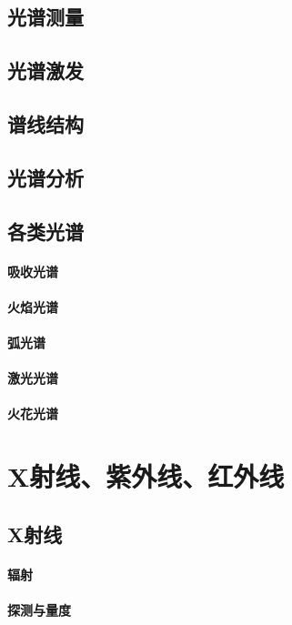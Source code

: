 \documentclass[UTF8]{../06-Physics}
\begin{document}
\section{光谱测量}
\section{光谱激发}
\section{谱线结构}
\section{光谱分析}
\section{各类光谱}
    \subsubsection{吸收光谱}
    \subsubsection{火焰光谱}
    \subsubsection{弧光谱}
    \subsubsection{激光光谱}
    \subsubsection{火花光谱}





\chapter{X射线、紫外线、红外线}
\section{X射线}
    \subsubsection{辐射}
    \subsubsection{探测与量度}
\end{document}
